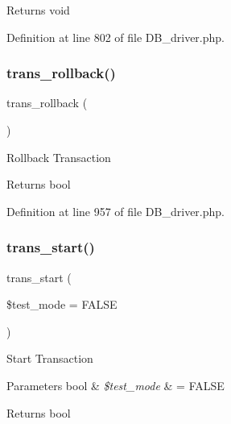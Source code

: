 \begin{DoxyReturn}{Returns}
void 
\end{DoxyReturn}


Definition at line 802 of file D\+B\+\_\+driver.\+php.

\mbox{\label{class_c_i___d_b__driver_a53f76d4dfcd6ac04fb653982442aeef8}} 
\subsubsection{\texorpdfstring{trans\_rollback()}{trans\_rollback()}}
{\footnotesize\ttfamily trans\+\_\+rollback (\begin{DoxyParamCaption}{ }\end{DoxyParamCaption})}

Rollback Transaction

\begin{DoxyReturn}{Returns}
bool 
\end{DoxyReturn}


Definition at line 957 of file D\+B\+\_\+driver.\+php.

\mbox{\label{class_c_i___d_b__driver_ab082d21c9a77398c6d6705d9e978fb20}} 
\subsubsection{\texorpdfstring{trans\_start()}{trans\_start()}}
{\footnotesize\ttfamily trans\+\_\+start (\begin{DoxyParamCaption}\item[{}]{\$test\+\_\+mode = {\ttfamily FALSE} }\end{DoxyParamCaption})}

Start Transaction


\begin{DoxyParams}[1]{Parameters}
bool & {\em \$test\+\_\+mode} & = F\+A\+L\+SE \\
\hline
\end{DoxyParams}
\begin{DoxyReturn}{Returns}
bool 
\end{DoxyReturn}



